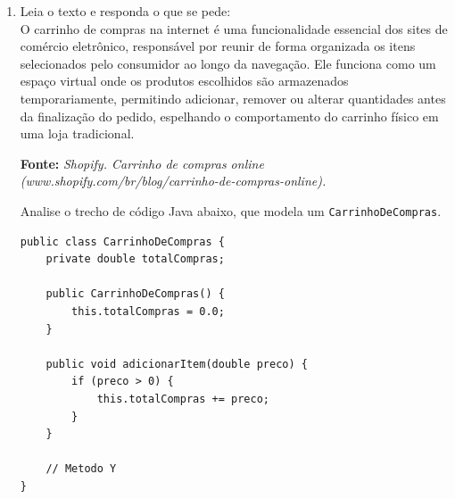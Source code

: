 \documentclass[12pt,a4paper]{article}
\newcommand{\resposta}[1]{
\noindent
\framebox[\textwidth]{
\begin{minipage}{0.98\textwidth}
\vspace{#1}
\end{minipage}
}
}
\begin{document}
\begin{enumerate}
    Explique, conceitualmente, a extrema importância de se utilizar abordagens controladas via métodos \textit{getters} e \textit{setters} em vez de permitir o acesso e intervenção direta no atributo \texttt{temperaturaDesejada} (\textbf{limite-se apenas à linguagem humana verbal escrita, sem programação}). 
    Complementarmente, dê um bom exemplo lúdico de regra de negócio/controle de limites que faria todo sentido e poderia ser codificada no corpo do método \texttt{setTemperatura(temp: double)}, evitando falhas do dispositivo de refrigeração.

    \resposta{13cm}

    \vspace{0.3cm}
    
    \item Leia o texto e responda o que se pede: \\
    O carrinho de compras na internet é uma funcionalidade essencial dos sites de comércio eletrônico, responsável por reunir de forma organizada os itens selecionados pelo consumidor ao longo da navegação. Ele funciona como um espaço virtual onde os produtos escolhidos são armazenados temporariamente, permitindo adicionar, remover ou alterar quantidades antes da finalização do pedido, espelhando o comportamento do carrinho físico em uma loja tradicional.

\noindent \textbf{Fonte:} \textit{Shopify. Carrinho de compras online (www.shopify.com/br/blog/carrinho-de-compras-online).}
    
    
    
    Analise o trecho de código Java abaixo, que modela um \texttt{CarrinhoDeCompras}.

\begin{lstlisting}
public class CarrinhoDeCompras {
    private double totalCompras;

    public CarrinhoDeCompras() {
        this.totalCompras = 0.0;
    }

    public void adicionarItem(double preco) {
        if (preco > 0) {
            this.totalCompras += preco;
        }
    }
    
    // Metodo Y
}
\end{lstlisting}


\end{enumerate}
\end{document}
